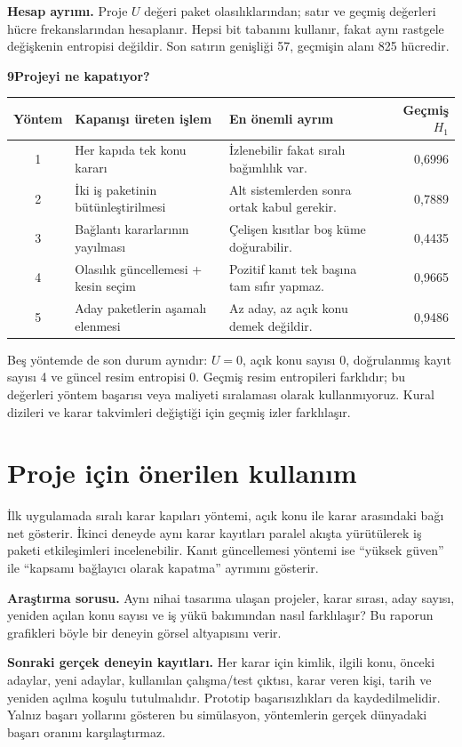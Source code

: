 \documentclass[11pt,a4paper]{article}
\newcommand{\heading}[2]{{\sffamily\small\color{blue!40!black}#1}\par{\sffamily\LARGE\bfseries#2}\par\vspace{3mm}}
\newcommand{\page}[2]{\newpage\heading{#1}{#2}}
\begin{document}
\textbf{Hesap ayrımı.} Proje $U$ değeri paket olasılıklarından; satır ve geçmiş değerleri hücre frekanslarından hesaplanır. Hepsi bit tabanını kullanır, fakat aynı rastgele değişkenin entropisi değildir. Son satırın genişliği 57, geçmişin alanı 825 hücredir.
\page{Yöntemlerin karşılaştırılması}{9\quad Projeyi ne kapatıyor?}
\begin{center}\small\begin{tabular}{c p{47mm} p{65mm} r}\toprule
Yöntem & Kapanışı üreten işlem & En önemli ayrım & Geçmiş $H_1$\\\midrule
1 & Her kapıda tek konu kararı & İzlenebilir fakat sıralı bağımlılık var. & 0,6996 \\
2 & İki iş paketinin bütünleştirilmesi & Alt sistemlerden sonra ortak kabul gerekir. & 0,7889 \\
3 & Bağlantı kararlarının yayılması & Çelişen kısıtlar boş küme doğurabilir. & 0,4435 \\
4 & Olasılık güncellemesi + kesin seçim & Pozitif kanıt tek başına tam sıfır yapmaz. & 0,9665 \\
5 & Aday paketlerin aşamalı elenmesi & Az aday, az açık konu demek değildir. & 0,9486 \\
\bottomrule\end{tabular}\end{center}
Beş yöntemde de son durum aynıdır: $U=0$, açık konu sayısı 0, doğrulanmış
kayıt sayısı 4 ve güncel resim entropisi 0. Geçmiş resim entropileri farklıdır;
bu değerleri yöntem başarısı veya maliyeti sıralaması olarak kullanmıyoruz.
Kural dizileri ve karar takvimleri değiştiği için geçmiş izler farklılaşır.

\section*{Proje için önerilen kullanım}
İlk uygulamada sıralı karar kapıları yöntemi, açık konu ile karar arasındaki
bağı net gösterir. İkinci deneyde aynı karar kayıtları paralel akışta yürütülerek
iş paketi etkileşimleri incelenebilir. Kanıt güncellemesi yöntemi ise
``yüksek güven'' ile ``kapsamı bağlayıcı olarak kapatma'' ayrımını gösterir.

\textbf{Araştırma sorusu.} Aynı nihai tasarıma ulaşan projeler, karar sırası,
aday sayısı, yeniden açılan konu sayısı ve iş yükü bakımından nasıl farklılaşır?
Bu raporun grafikleri böyle bir deneyin görsel altyapısını verir.

\textbf{Sonraki gerçek deneyin kayıtları.} Her karar için kimlik, ilgili konu,
önceki adaylar, yeni adaylar, kullanılan çalışma/test çıktısı, karar veren kişi,
tarih ve yeniden açılma koşulu tutulmalıdır. Prototip başarısızlıkları da
kaydedilmelidir. Yalnız başarı yollarını gösteren bu simülasyon, yöntemlerin
gerçek dünyadaki başarı oranını karşılaştırmaz.
\end{document}
